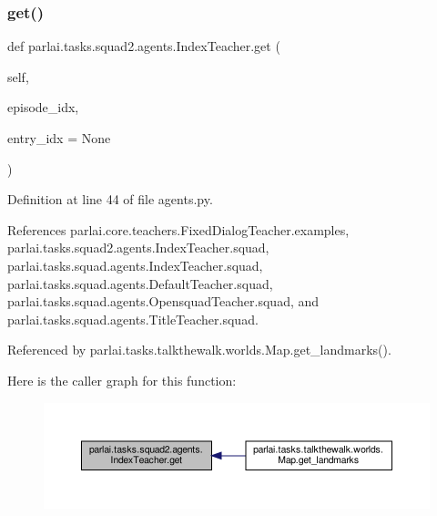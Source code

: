 \subsubsection{\texorpdfstring{get()}{get()}}
{\footnotesize\ttfamily def parlai.\+tasks.\+squad2.\+agents.\+Index\+Teacher.\+get (\begin{DoxyParamCaption}\item[{}]{self,  }\item[{}]{episode\+\_\+idx,  }\item[{}]{entry\+\_\+idx = {\ttfamily None} }\end{DoxyParamCaption})}



Definition at line 44 of file agents.\+py.



References parlai.\+core.\+teachers.\+Fixed\+Dialog\+Teacher.\+examples, parlai.\+tasks.\+squad2.\+agents.\+Index\+Teacher.\+squad, parlai.\+tasks.\+squad.\+agents.\+Index\+Teacher.\+squad, parlai.\+tasks.\+squad.\+agents.\+Default\+Teacher.\+squad, parlai.\+tasks.\+squad.\+agents.\+Opensquad\+Teacher.\+squad, and parlai.\+tasks.\+squad.\+agents.\+Title\+Teacher.\+squad.



Referenced by parlai.\+tasks.\+talkthewalk.\+worlds.\+Map.\+get\+\_\+landmarks().

Here is the caller graph for this function\+:
\nopagebreak
\begin{figure}[H]
\begin{center}
\leavevmode
\includegraphics[width=350pt]{classparlai_1_1tasks_1_1squad2_1_1agents_1_1IndexTeacher_a55e2945cb45316a80fc158e8f13eb0ac_icgraph}
\end{center}
\end{figure}
\mbox{\label{classparlai_1_1tasks_1_1squad2_1_1agents_1_1IndexTeacher_aabf2ad3a489d5b1547afa2aaac7b5b79}} 
